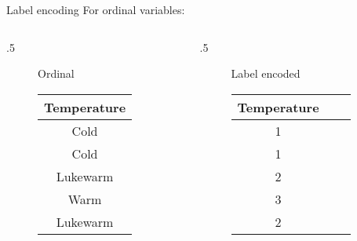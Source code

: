 \begin{frame}{Label encoding}
  For ordinal variables:
  \begin{columns}
    \begin{column}{.5\tw}
      \begin{figure}
        \centering
        Ordinal\\[.5cm]
        \begin{tabular}{c}
          \toprule
          Temperature \\
          \midrule
          Cold \\
          Cold \\
          Lukewarm \\
          Warm \\
          Lukewarm \\
          \bottomrule
        \end{tabular}
      \end{figure}
    \end{column}
    \begin{column}{.5\tw}
      \begin{figure}
        \centering
        Label encoded\\[.5cm]
        \begin{tabular}{ccc}
          \toprule
          Temperature \\
          \midrule
          1 \\
          1 \\
          2 \\
          3 \\
          2 \\
          \bottomrule
        \end{tabular}
      \end{figure}
    \end{column}
  \end{columns}
\end{frame}

